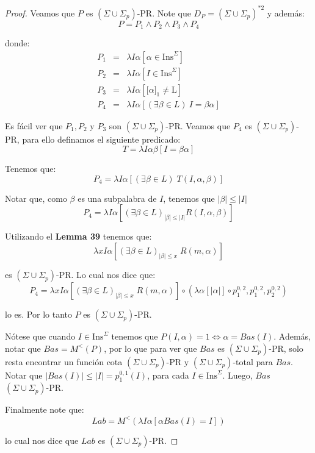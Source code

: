 \begin{proof}
    \PN Veamos que $P$ es $(\Sigma \cup \Sigma_{p})$-PR. Note que $D_{P} = (\Sigma \cup \Sigma_{p})^{\ast 2}$ y además:
    \[
      P = P_1 \wedge P_2 \wedge P_3 \wedge P_4
    \]

    \PN donde:
    \begin{eqnarray*}
      P_1 &=& \lambda I\alpha \left[\alpha \in \mathrm{Ins}^{\Sigma}\right] \\
      P_2 &=& \lambda I\alpha \left[I \in \mathrm{Ins}^{\Sigma}\right] \\
      P_3 &=& \lambda I\alpha \left[\lbrack \alpha]_{1} \neq \mathrm{L}\right] \\
      P_4 &=& \lambda I\alpha \left[ (\exists \beta \in L)\ I = \beta\alpha \right]
    \end{eqnarray*}

    \PN Es fácil ver que $P_1, P_2$ y $P_3$ son $(\Sigma \cup \Sigma_{p})$-PR. Veamos que $P_4$ es $(\Sigma \cup
    \Sigma_{p})$-PR, para ello definamos el siguiente predicado:
    \[
      T = \lambda I\alpha\beta \left[ I = \beta\alpha\right]
    \]

    \PN Tenemos que:
    \[
      P_4 = \lambda I\alpha \left[(\exists \beta \in L) \; T(I,\alpha,\beta)\right]
    \]

    \PN Notar que, como $\beta$ es una subpalabra de $I$, tenemos que $|\beta| \leq |I|$
    \[
      P_4 = \lambda I\alpha \left[ (\exists \beta \in L)_{|\beta|\leq |I|} R(I, \alpha, \beta) \right]
    \]

    \PN Utilizando el \textbf{Lemma 39} tenemos que:
    \[
      \lambda xI\alpha \left[(\exists \beta \in L)_{\lvert \beta \rvert \leq x} \; R(m,\alpha)\right]
    \]

    \PN es $(\Sigma \cup \Sigma_{p})$-PR. Lo cual nos dice que:
    \[
      P_4 = \lambda xI\alpha \left[(\exists \beta \in L)_{\lvert \beta \rvert \leq x} \; R(m,\alpha)\right] \circ
      (\lambda \alpha \left[\lvert \alpha \rvert\right] \circ p_{1}^{0,2},p_{1}^{0,2},p_{2}^{0,2})
    \]

    \PN lo es. Por lo tanto $P$ es $(\Sigma \cup \Sigma_{p})$-PR.

    \vspace{3mm}
    \PN Nótese que cuando $I \in \mathrm{Ins}^{\Sigma}$ tenemos que $P(I,\alpha)=1 \Leftrightarrow \alpha=Bas(I)$.
    Además, notar que $Bas = M^{<}\left(P\right)$, por lo que para ver que $Bas$ es $(\Sigma \cup \Sigma_{p})$-PR, solo
    resta encontrar un función cota $(\Sigma \cup \Sigma_{p})$-PR y $(\Sigma \cup \Sigma_{p})$-total para $Bas$. Notar
    que $\lvert Bas(I)\rvert \leq \lvert I \rvert = p_{1}^{0,1}(I)$, para cada $I \in \mathrm{Ins}^{\Sigma}$. Luego,
    $Bas$ $(\Sigma \cup \Sigma_{p})$-PR.

    \vspace{3mm}
    \PN Finalmente note que:
    \[
      Lab = M^{<} \left(\lambda I\alpha \left[\alpha Bas(I)=I\right]\right)
    \]

    \PN lo cual nos dice que $Lab$ es $(\Sigma \cup \Sigma_{p})$-PR.
  \end{proof}

